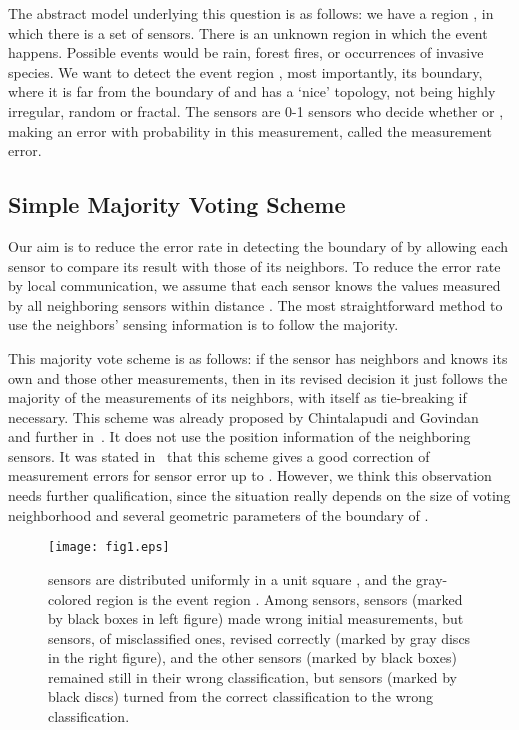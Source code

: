 \documentclass{article}
\begin{document}
\par
The abstract model underlying this question is as follows: we have a
region , in which there is a set  of sensors. There is an unknown
region  in which the event happens. Possible events would
be rain, forest fires, or occurrences of invasive species. We want to detect the event region , most importantly, its boundary, where it is far from the boundary of  and has a `nice' topology, not being highly irregular, random or fractal. The sensors  are 0-1 sensors who decide whether  or , making an error with probability  in this measurement, called the measurement error.

\subsection{Simple Majority Voting Scheme}
Our aim is to reduce the error rate in detecting the boundary of 
by allowing each sensor to compare its result with those of its neighbors. To reduce the error rate by local communication, we assume that each sensor knows the values measured by all neighboring sensors within distance . The most
straightforward method to use the neighbors' sensing information is
to follow the majority.

This majority vote scheme is as follows: if the sensor has  neighbors and knows its own and those  other measurements, then in its revised decision it just follows the majority of the measurements of its  neighbors, with itself as tie-breaking if necessary.
This scheme was already proposed by Chintalapudi and Govindan~\cite{CG03}
and further in~\cite{KI04}. It does not use the position information of
the neighboring sensors. It was stated in~\cite{KI04} that this scheme
gives a good correction of measurement errors for sensor error  up
to . However, we think this observation needs further qualification,
since the situation really depends on the size of voting neighborhood
and several geometric parameters of the boundary of .

\begin{figure}
\centering
\texttt{[image: fig1.eps]}
\caption{ sensors are distributed uniformly in a unit square , and the gray-colored region is the event region . Among  sensors,  sensors (marked by black boxes in left figure) made wrong initial measurements, but  sensors,  of misclassified ones, revised correctly (marked by gray discs in the right figure), and the other  sensors (marked by black boxes) remained still in their wrong classification, but  sensors (marked by black discs) turned from the correct classification to the wrong classification.}
\label{fig:intro}
\end{figure}
\end{document}
